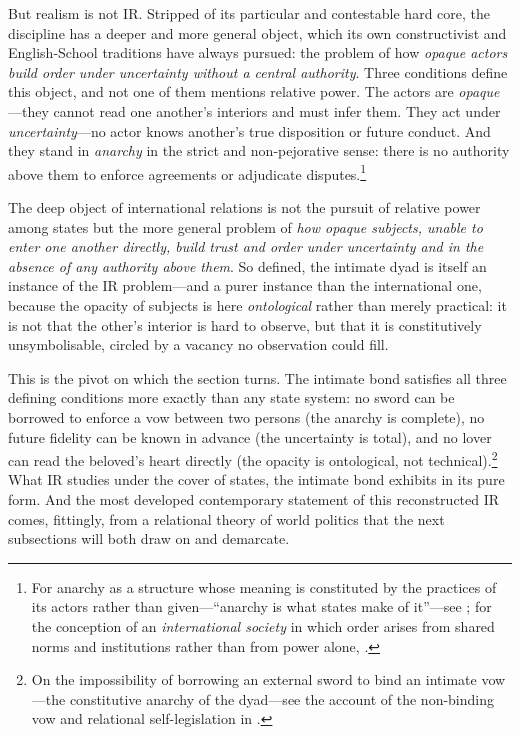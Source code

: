But realism is not IR. Stripped of its particular and contestable hard core, the discipline has a deeper and more general object, which its own constructivist and English-School traditions have always pursued: the problem of how \emph{opaque actors build order under uncertainty without a central authority}. Three conditions define this object, and not one of them mentions relative power. The actors are \emph{opaque}---they cannot read one another's interiors and must infer them. They act under \emph{uncertainty}---no actor knows another's true disposition or future conduct. And they stand in \emph{anarchy} in the strict and non-pejorative sense: there is no authority above them to enforce agreements or adjudicate disputes.\footnote{For anarchy as a structure whose meaning is constituted by the practices of its actors rather than given---``anarchy is what states make of it''---see \textcite{wendt1992}; for the conception of an \emph{international society} in which order arises from shared norms and institutions rather than from power alone, \textcite{bull1977}.}

\begin{claim}
The deep object of international relations is not the pursuit of relative power among states but the more general problem of \emph{how opaque subjects, unable to enter one another directly, build trust and order under uncertainty and in the absence of any authority above them}. So defined, the intimate dyad is itself an instance of the IR problem---and a purer instance than the international one, because the opacity of subjects is here \emph{ontological} rather than merely practical: it is not that the other's interior is hard to observe, but that it is constitutively unsymbolisable, circled by a vacancy no observation could fill.
\end{claim}

\noindent
This is the pivot on which the section turns. The intimate bond satisfies all three defining conditions more exactly than any state system: no sword can be borrowed to enforce a vow between two persons (the anarchy is complete), no future fidelity can be known in advance (the uncertainty is total), and no lover can read the beloved's heart directly (the opacity is ontological, not technical).\footnote{On the impossibility of borrowing an external sword to bind an intimate vow---the constitutive anarchy of the dyad---see the account of the non-binding vow and relational self-legislation in \textcite{paperxiii}.} What IR studies under the cover of states, the intimate bond exhibits in its pure form. And the most developed contemporary statement of this reconstructed IR comes, fittingly, from a relational theory of world politics that the next subsections will both draw on and demarcate.

